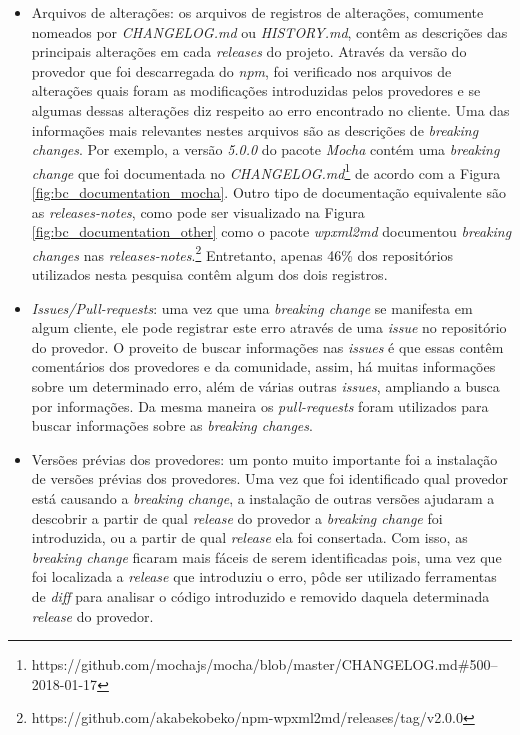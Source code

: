 \begin{itemize}
    \item Arquivos de alterações: os arquivos de registros de alterações, comumente nomeados por \textit{CHANGELOG.md} ou \textit{HISTORY.md}, contêm as descrições das principais alterações em cada \textit{releases} do projeto. Através da versão do provedor que foi descarregada do \textit{npm}, foi verificado nos arquivos de alterações quais foram as modificações introduzidas pelos provedores e se algumas dessas alterações diz respeito ao erro encontrado no cliente. Uma das informações mais relevantes nestes arquivos são as descrições de \textit{breaking changes}. Por exemplo, a versão \textit{5.0.0} do pacote \textit{Mocha} contém uma \textit{breaking change} que foi documentada no \textit{CHANGELOG.md}\footnote{https://github.com/mochajs/mocha/blob/master/CHANGELOG.md\#500--2018-01-17} de acordo com a Figura \ref{fig:bc_documentation_mocha}. Outro tipo de documentação equivalente são as \textit{releases-notes}, como pode ser visualizado na Figura \ref{fig:bc_documentation_other} como o pacote \textit{wpxml2md} documentou \textit{breaking changes} nas \textit{releases-notes}.\footnote{https://github.com/akabekobeko/npm-wpxml2md/releases/tag/v2.0.0} Entretanto, apenas 46\% dos repositórios utilizados nesta pesquisa contêm algum dos dois registros.

    \item \textit{Issues/Pull-requests}: uma vez que uma \textit{breaking change} se manifesta em algum cliente, ele pode registrar este erro através de uma \textit{issue} no repositório do provedor. O proveito de buscar informações nas \textit{issues} é que essas contêm comentários dos provedores e da comunidade, assim, há muitas informações sobre um determinado erro, além de várias outras \textit{issues}, ampliando a busca por informações. Da mesma maneira os \textit{pull-requests} foram utilizados para buscar informações sobre as \textit{breaking changes}.

    \item Versões prévias dos provedores: um ponto muito importante foi a instalação de versões prévias dos provedores. Uma vez que foi identificado qual provedor está causando a \textit{breaking change}, a instalação de outras versões ajudaram a descobrir a partir de qual \textit{release} do provedor a \textit{breaking change} foi introduzida, ou a partir de qual \textit{release} ela foi consertada. Com isso, as \textit{breaking change} ficaram mais fáceis de serem identificadas pois, uma vez que foi localizada a \textit{release} que introduziu o erro, pôde ser utilizado ferramentas de \textit{diff} para analisar o código introduzido e removido daquela determinada \textit{release} do provedor.


\end{itemize}
